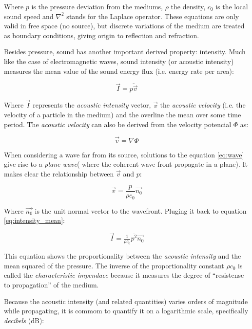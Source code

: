 Where $p$ is the pressure deviation from the mediums, $\rho$ the density, $c_0$
is the local sound speed and $\nabla^2$ stands for the Laplace operator. These equations are
only valid in free space (no source), but discrete variations of the medium are
treated as boundary conditions, giving origin to reflection and refraction.

Besides pressure, sound has another important derived property: intensity. Much
like the case of electromagnetic waves, sound intensity (or acoustic intensity)
measures the mean value of the sound energy flux (i.e. energy rate
per area):

\begin{equation}\label{eq:intensity_mean}
\vec{I} = \overline{p\vec{v}}
\end{equation}

Where $\vec{I}$ represents the \textit{acoustic intensity} vector, $\vec{v}$ the
\textit{acoustic velocity} (i.e. the velocity of a particle in the medium) and the
overline the mean over some time period. The \textit{acoustic velocity} can also
be derived from the velocity potencial $\Phi$ as:

\[ \vec{v} = \nabla \Phi\]

When considering a wave far from its source, solutions to the equation
\ref{eq:wave} give rise to a \textit{plane wave}( where the coherent wave front
propagate in a plane). It makes clear the relationship between $\vec{v}$ and
$p$:

\[ \vec{v} = \frac{p}{\rho c_0} \vec{n_0} \]

Where $\vec{n_0}$ is the unit normal vector to the wavefront. Pluging it back to
equation \ref{eq:intensity_mean}:

\begin{equation}\label{eq:intensity_pressure}
\vec{I} = \tfrac{1}{\rho c_0} \overline{p^2} \vec{n_0}
\end{equation}

This equation shows the proportionality between the \textit{acoustic
intensity} and the mean squared of the pressure. The inverse of the
proportionality constant $\rho c_0$ is called the \textit{characteristic
impendace} because it measures the degree of ``resistense to propagation'' of
the medium.



Because the acoustic intensity (and related quantities) varies orders of
magnitude while propagating, it is commom to quantify it on a logarithmic scale,
specifically \textit{decibels} (dB)\cite{LURTON}:

